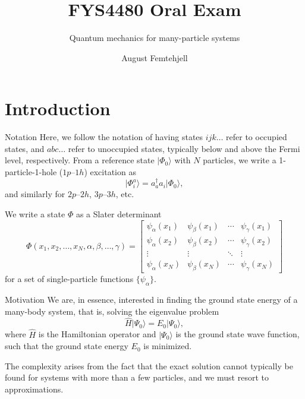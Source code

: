\documentclass[UKenglish,aspectratio=169]{beamer}
\title{FYS4480 Oral Exam}
\subtitle{Quantum mechanics for many-particle systems}
\author{August Femtehjell}
\begin{document}
\uiofrontpage[
    date={16th December, 2024},
]

\section{Introduction}
\begin{frame}{Notation}
    Here, we follow the notation of having states $ijk\ldots$ refer
    to occupied states, and $abc\ldots$ refer to unoccupied states,
    typically below and above the Fermi level, respectively.
    From a reference state $\lvert \Phi_0 \rangle$ with $N$
    particles, we write a 1-particle-1-hole ($1p$--$1h$) excitation as
    \begin{equation}
        \lvert \Phi_{i}^{a} \rangle
        = a_{a}^\dagger a_{i} \lvert \Phi_0 \rangle,
    \end{equation}
    and similarly for $2p$--$2h$, $3p$--$3h$, etc.

    We write a state $\Phi$ as a Slater determinant
    \begin{equation}
        \Phi(x_1, x_2, \ldots, x_N, \alpha, \beta, \ldots, \gamma) =
        \begin{bmatrix}
            \psi_{\alpha}(x_1) & \psi_{\beta}(x_1) & \cdots & \psi_{\gamma}(x_1) \\
            \psi_{\alpha}(x_2) & \psi_{\beta}(x_2) & \cdots & \psi_{\gamma}(x_2) \\
            \vdots & \vdots & \ddots & \vdots \\
            \psi_{\alpha}(x_N) & \psi_{\beta}(x_N) & \cdots & \psi_{\gamma}(x_N)
        \end{bmatrix}
    \end{equation}
    for a set of single-particle functions $\{\psi_{\alpha}\}$.

\end{frame}

\begin{frame}{Motivation}
    We are, in essence, interested in finding the ground state energy
    of a many-body system, that is, solving the eigenvalue problem
    \begin{equation}
        \hat{H} \lvert \Psi_0 \rangle = E_0 \lvert \Psi_0 \rangle,
    \end{equation}
    where $\hat{H}$ is the Hamiltonian operator and $\lvert \Psi_0
    \rangle$ is the ground state wave function, such that the ground
    state energy $E_0$ is minimized.

    \bigskip

    The complexity arises from the fact that the exact solution
    cannot typically be found for systems with more than a few
    particles, and we must resort to approximations.
\end{frame}
\end{document}
